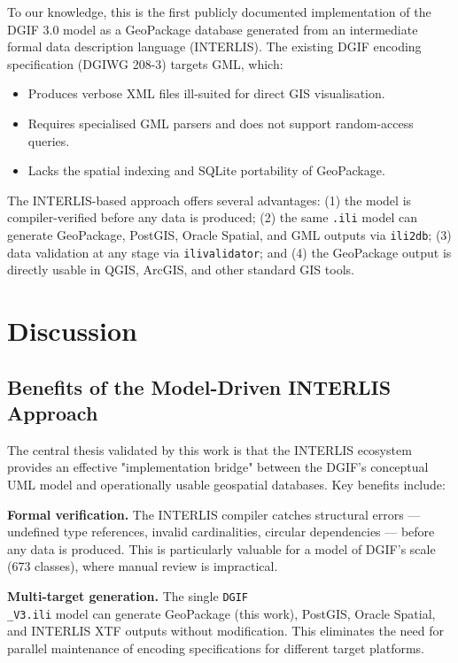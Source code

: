\documentclass[conference]{IEEEtran}
\begin{document}
To our knowledge, this is the first publicly documented implementation of the DGIF 3.0 model as a GeoPackage database generated from an intermediate formal data description language (INTERLIS). The existing DGIF encoding specification (DGIWG 208-3) targets GML, which:

\begin{itemize}[leftmargin=*]
\item Produces verbose XML files ill-suited for direct GIS visualisation.
\item Requires specialised GML parsers and does not support random-access queries.
\item Lacks the spatial indexing and SQLite portability of GeoPackage.
\end{itemize}

The INTERLIS-based approach offers several advantages: (1) the model is compiler-verified before any data is produced; (2) the same \texttt{.ili} model can generate GeoPackage, PostGIS, Oracle Spatial, and GML outputs via \texttt{ili2db}; (3) data validation at any stage via \texttt{ilivalidator}; and (4) the GeoPackage output is directly usable in QGIS, ArcGIS, and other standard GIS tools.



\section{Discussion}

\subsection{Benefits of the Model-Driven INTERLIS Approach}

The central thesis validated by this work is that the INTERLIS ecosystem provides an effective "implementation bridge" between the DGIF's conceptual UML model and operationally usable geospatial databases. Key benefits include:

\textbf{Formal verification.} The INTERLIS compiler catches structural errors — undefined type references, invalid cardinalities, circular dependencies — before any data is produced. This is particularly valuable for a model of DGIF's scale (673 classes), where manual review is impractical.

\textbf{Multi-target generation.} The single \texttt{DGIF\\_V3.ili} model can generate GeoPackage (this work), PostGIS, Oracle Spatial, and INTERLIS XTF outputs without modification. This eliminates the need for parallel maintenance of encoding specifications for different target platforms.
\end{document}
